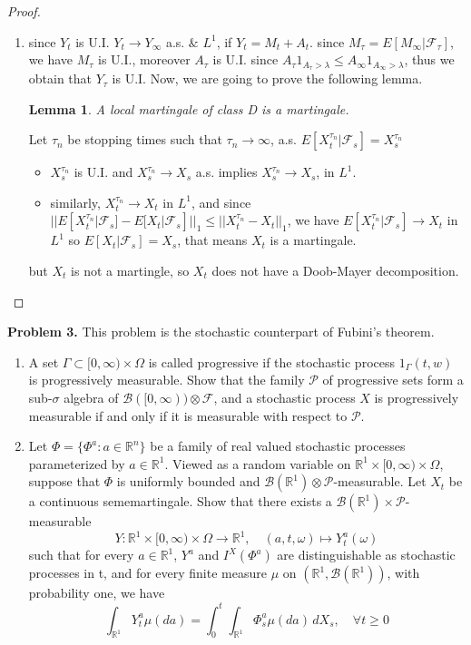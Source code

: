 \documentclass{article}     %
\newtheorem{lemma}[theorem]{Lemma}
\begin{document}
\begin{proof}
\begin{enumerate}[(1)]
    \item since $Y_t$ is U.I. $Y_t \rightarrow Y_{\infty}$ a.s. ${\&}$ $L^1$, if $Y_t = M_t + A_t$. since
    $M_{\tau} = E[M_{\infty}|\mathcal{F}_{\tau}]$, we have $M_{\tau}$ is U.I., moreover $A_{\tau}$ is U.I. since $A_{\tau}1_{ A_{\tau}>\lambda }\leq A_\infty1_{A_{\infty}>\lambda}$, thus we obtain that $Y_\tau$ is U.I. Now, we are going to prove the following lemma.
    \begin{lemma}
     A local martingale of class D is a martingale.
     \end{lemma}
     Let $\tau_n$ be stopping times such that $\tau_n\rightarrow \infty$, a.s. $E[X^{\tau_n}_t|\mathcal{F}_s]= X^{\tau_n}_s$ 
     \begin{itemize}
     \item $X^{\tau_n}_s$ is U.I. and $X^{\tau_n}_s\rightarrow X_s$ a.s. implies $X^{\tau_n}_s\rightarrow X_s$, in $L^1$.
     \item similarly, $X_t^{\tau_n}\rightarrow X_t$ in $L^1$, and since $||E[X^{\tau_n}_t|\mathcal{F}_s]-E[X_t|\mathcal{F}_s]||_1\leq ||X^{\tau_n}_t-X_t||_1$, we have $E[X^{\tau_n}_t|\mathcal{F}_s]\rightarrow X_t$ in $L^1$
     so $E[X_t|\mathcal{F}_s]= X_s$, that means $X_t$ is a martingale. 
     \end{itemize}
     but $X_t$ is not a martingle, so $X_t$ does not have a Doob-Mayer decomposition.
\end{enumerate}
\end{proof}




\noindent
\textbf{Problem 3.} This problem is the stochastic counterpart of Fubini's theorem. 
\begin{enumerate}
    \item A set $\Gamma \subset [0,\infty)\times \Omega$ is called progressive if the stochastic process $1_{\Gamma}(t,w)$ is progressively measurable. Show that the family $\mathcal{P}$ of progressive sets form a sub-$\sigma$ algebra of $\mathcal{B}([0,\infty))\otimes \mathcal{F}$, and a stochastic process $X$ is progressively measurable if and only if it is measurable with respect to $\mathcal{P}$.
    \item Let $\Phi= \{\Phi^a: a\in \mathbb{R}^n\}$ be a family of real valued stochastic processes parameterized by $a\in \mathbb{R}^1$. Viewed as a random variable on $\mathbb{R}^1\times [0,\infty)\times \Omega$, suppose that $\Phi$ is uniformly bounded and $\mathcal{B}(\mathbb{R}^1)\otimes \mathcal{P}$-measurable. Let $X_t$ be a continuous sememartingale. Show that there exists a $\mathcal{B}(\mathbb{R}^1)\times \mathcal{P}$-measurable 
    \[Y:\mathbb{R}^1\times [0,\infty)\times \Omega\rightarrow \mathbb{R}^1, \quad (a,t,\omega)\mapsto Y^a_t(\omega)\]
    such that for every $a\in \mathbb{R}^1$, $Y^a$ and $I^X(\Phi^a)$ are distinguishable as stochastic processes in t, and for every finite measure $\mu$ on $(\mathbb{R}^1,\mathcal{B}(\mathbb{R}^1))$, with probability one, we have
    \[\int_{\mathbb{R}^1} Y_t^a \mu(da)= \int_0^t \int_{\mathbb{R}^1}\Phi^a_s\mu(da)\,dX_s,\quad \forall t\geq 0\]
    
    \end{enumerate}
    
\end{document}
